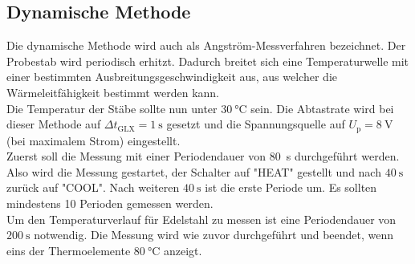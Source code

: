 \subsection{Dynamische Methode}
Die dynamische Methode wird auch als Angström-Messverfahren bezeichnet.
Der Probestab wird periodisch erhitzt.
Dadurch breitet sich eine Temperaturwelle mit einer bestimmten Ausbreitungsgeschwindigkeit aus, aus welcher die Wärmeleitfähigkeit bestimmt werden kann.
\\
Die Temperatur der Stäbe sollte nun unter $\SI{30}{\celsius}$ sein.
Die Abtastrate wird bei dieser Methode auf $\Delta t_\text{GLX}=\SI{1}{\second}$ gesetzt und die Spannungsquelle auf $U_\text{p} = \SI{8}{\volt}$ (bei maximalem Strom) eingestellt.
\\
Zuerst soll die Messung mit einer Periodendauer von \SI{80}{\second} durchgeführt werden.
Also wird die Messung gestartet, der Schalter auf "HEAT" gestellt und nach $\SI{40}{\second}$ zurück auf "COOL".
Nach weiteren $\SI{40}{\second}$ ist die erste Periode um.
Es sollten mindestens 10 Perioden gemessen werden.
\\
Um den Temperaturverlauf für Edelstahl zu messen ist eine Periodendauer von $\SI{200}{\second}$ notwendig.
Die Messung wird wie zuvor durchgeführt und beendet, wenn eins der Thermoelemente $\SI{80}{\celsius}$ anzeigt.